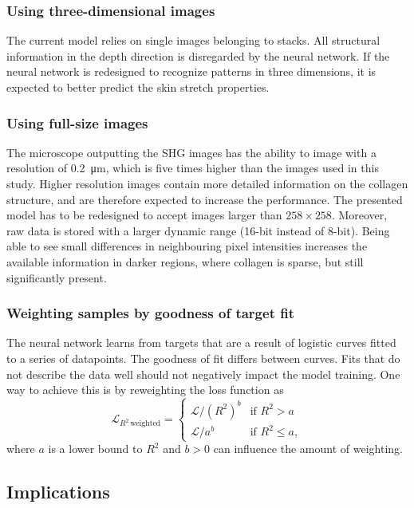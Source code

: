 \subsubsection{Using three-dimensional images}
The current model relies on single images belonging to stacks.
All structural information in the depth direction is disregarded by the neural network.
If the neural network is redesigned to recognize patterns in three dimensions, it is expected to better predict the skin stretch properties.

\subsubsection{Using full-size images}
The microscope outputting the SHG images has the ability to image with a resolution of \qty{0.2}{\micro\meter}, which is five times higher than the images used in this study.
Higher resolution images contain more detailed information on the collagen structure, and are therefore expected to increase the performance.
The presented model has to be redesigned to accept images larger than $258\times258$.
Moreover, raw data is stored with a larger dynamic range (16-bit instead of 8-bit).
Being able to see small differences in neighbouring pixel intensities increases the available information \eg in darker regions, where collagen is sparse, but still significantly present.

\subsubsection{Weighting samples by goodness of target fit}
The neural network learns from targets that are a result of logistic curves fitted to a series of datapoints.
The goodness of fit differs between curves.
Fits that do not describe the data well should not negatively impact the model training.
One way to achieve this is by reweighting the loss function as
\begin{equation}
    \mathcal{L}_{R^2\,\mathrm{weighted}} =
    \begin{cases}
        \mathcal{L} / \left(R^2\right)^b & \text{if } R^2 > a     \\
        \mathcal{L} / a^b                & \text{if } R^2 \leq a,
    \end{cases}
\end{equation}
where $a$ is a lower bound to $R^2$ and $b > 0$ can influence the amount of weighting.

\subsection{Implications}
